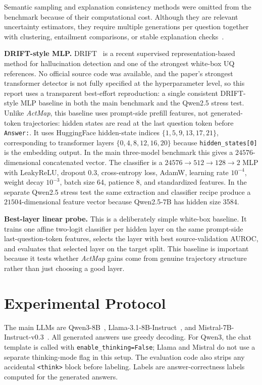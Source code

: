 \documentclass{article}
\newcommand{\actmap}{\textit{ActMap}}
\begin{document}
Semantic sampling and explanation consistency methods were omitted from the benchmark because of their computational cost. Although they are relevant uncertainty estimators, they require multiple generations per question together with clustering, entailment comparisons, or stable explanation checks~\cite{becker2024,farquhar2024}.

\textbf{DRIFT-style MLP.} DRIFT~\cite{bhatnagar2026} is a recent supervised representation-based method for hallucination detection and one of the strongest white-box UQ references. No official source code was available, and the paper's strongest transformer detector is not fully specified at the hyperparameter level, so this report uses a transparent best-effort reproduction: a single consistent DRIFT-style MLP baseline in both the main benchmark and the Qwen2.5 stress test. Unlike \actmap{}, this baseline uses prompt-side prefill features, not generated-token trajectories: hidden states are read at the last question token before \texttt{Answer:}. It uses HuggingFace hidden-state indices \(\{1,5,9,13,17,21\}\), corresponding to transformer layers \(\{0,4,8,12,16,20\}\) because \texttt{hidden\_states[0]} is the embedding output. In the main three-model benchmark this gives a \(24576\)-dimensional concatenated vector. The classifier is a \(24576 \rightarrow 512 \rightarrow 128 \rightarrow 2\) MLP with LeakyReLU, dropout 0.3, cross-entropy loss, AdamW, learning rate \(10^{-4}\), weight decay \(10^{-3}\), batch size 64, patience 8, and standardized features. In the separate Qwen2.5 stress test the same extraction and classifier recipe produce a \(21504\)-dimensional feature vector because Qwen2.5-7B has hidden size 3584.

\textbf{Best-layer linear probe.} This is a deliberately simple white-box baseline. It trains one affine two-logit classifier per hidden layer on the same prompt-side last-question-token features, selects the layer with best source-validation AUROC, and evaluates that selected layer on the target split. This baseline is important because it tests whether \actmap{} gains come from genuine trajectory structure rather than just choosing a good layer.

\section{Experimental Protocol}

The main LLMs are Qwen3-8B~\cite{qwen3}, Llama-3.1-8B-Instruct~\cite{llama3}, and Mistral-7B-Instruct-v0.3~\cite{mistral7b}. All generated answers use greedy decoding. For Qwen3, the chat template is called with \texttt{enable\_thinking=False}; Llama and Mistral do not use a separate thinking-mode flag in this setup. The evaluation code also strips any accidental \texttt{<think>} block before labeling. Labels are answer-correctness labels computed for the generated answers.
\end{document}
